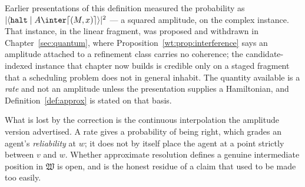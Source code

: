 \begin{remark}
\label{rmk:approx-status}
Earlier presentations of this definition measured the probability as
$|\langle \mathtt{halt} \mid A \inter \lceil (M,x) \rceil \rangle|^2$ ---
a squared amplitude, on the complex instance.
That instance, in the linear fragment, was proposed and withdrawn in
Chapter~\ref{sec:quantum}, where Proposition~\ref{wt:prop:interference}
says an amplitude attached to a refinement class carries no coherence;
the candidate-indexed instance that chapter now builds is credible only
on a staged fragment that a scheduling problem does not in general
inhabit.
The quantity available is a \emph{rate} and not an amplitude unless the
presentation supplies a Hamiltonian, and
Definition~\ref{def:approx} is stated on that basis.

What is lost by the correction is the continuous interpolation the
amplitude version advertised.
A rate gives a probability of being right, which grades an agent's
\emph{reliability} at $w$; it does not by itself place the agent at a
point strictly between $v$ and $w$.
Whether approximate resolution defines a genuine intermediate position in
$\mathfrak{W}$ is open, and is the honest residue of a claim that used to
be made too easily.
\end{remark}

